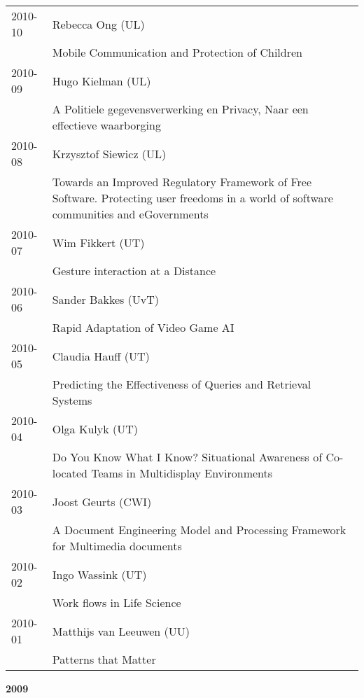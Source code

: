\begin{longtable}{p{1.25cm}p{10.75cm}}
2010-10 & Rebecca Ong (UL) \\& Mobile Communication and Protection of Children \\
2010-09 & Hugo Kielman (UL) \\& A Politiele gegevensverwerking en Privacy, Naar een effectieve waarborging \\
2010-08 & Krzysztof Siewicz (UL) \\& Towards an Improved Regulatory Framework of Free Software. Protecting user freedoms in a world of software communities and eGovernments \\
2010-07 & Wim Fikkert (UT) \\& Gesture interaction at a Distance \\
2010-06 & Sander Bakkes (UvT) \\& Rapid Adaptation of Video Game AI \\
2010-05 & Claudia Hauff (UT) \\& Predicting the Effectiveness of Queries and Retrieval Systems \\
2010-04 & Olga Kulyk (UT) \\& Do You Know What I Know? Situational Awareness of Co-located Teams in Multidisplay Environments \\
2010-03 & Joost Geurts (CWI) \\& A Document Engineering Model and Processing Framework for Multimedia documents \\
2010-02 & Ingo Wassink (UT) \\& Work flows in Life Science \\
2010-01 & Matthijs van Leeuwen (UU) \\& Patterns that Matter \\
\end{longtable}

\begin{center}
	\large{\textbf{2009}}
\end{center}

